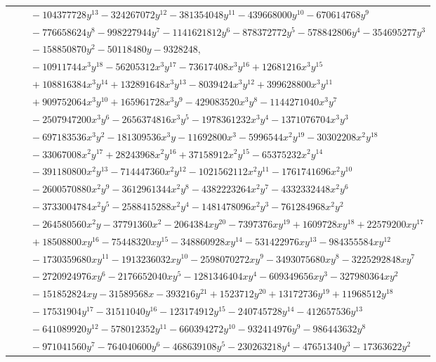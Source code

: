 \documentclass[11pt]{article}
\begin{document}
\begin{longtable}{@{}ll@{}}
 & $\quad -104377728y^{13}-324267072y^{12}-381354048y^{11}-439668000y^{10}-670614768y^{9}$\\
 & $\quad -776658624y^{8}-998227944y^{7}-1141621812y^{6}-878372772y^{5}-578842806y^{4}-354695277y^{3}$\\
 & $\quad -158850870y^{2}-50118480y-9328248,$\\
 & $\quad -10911744x^{3}y^{18}-56205312x^{3}y^{17}-73617408x^{3}y^{16}+12681216x^{3}y^{15}$\\
 & $\quad +108816384x^{3}y^{14}+132891648x^{3}y^{13}-8039424x^{3}y^{12}+399628800x^{3}y^{11}$\\
 & $\quad +909752064x^{3}y^{10}+165961728x^{3}y^{9}-429083520x^{3}y^{8}-1144271040x^{3}y^{7}$\\
 & $\quad -2507947200x^{3}y^{6}-2656374816x^{3}y^{5}-1978361232x^{3}y^{4}-1371076704x^{3}y^{3}$\\
 & $\quad -697183536x^{3}y^{2}-181309536x^{3}y-11692800x^{3}-5996544x^{2}y^{19}-30302208x^{2}y^{18}$\\
 & $\quad -33067008x^{2}y^{17}+28243968x^{2}y^{16}+37158912x^{2}y^{15}-65375232x^{2}y^{14}$\\
 & $\quad -391180800x^{2}y^{13}-714447360x^{2}y^{12}-1021562112x^{2}y^{11}-1761741696x^{2}y^{10}$\\
 & $\quad -2600570880x^{2}y^{9}-3612961344x^{2}y^{8}-4382223264x^{2}y^{7}-4332332448x^{2}y^{6}$\\
 & $\quad -3733004784x^{2}y^{5}-2588415288x^{2}y^{4}-1481478096x^{2}y^{3}-761284968x^{2}y^{2}$\\
 & $\quad -264580560x^{2}y-37791360x^{2}-2064384xy^{20}-7397376xy^{19}+1609728xy^{18}+22579200xy^{17}$\\
 & $\quad +18508800xy^{16}-75448320xy^{15}-348860928xy^{14}-531422976xy^{13}-984355584xy^{12}$\\
 & $\quad -1730359680xy^{11}-1913236032xy^{10}-2598070272xy^{9}-3493075680xy^{8}-3225292848xy^{7}$\\
 & $\quad -2720924976xy^{6}-2176652040xy^{5}-1281346404xy^{4}-609349656xy^{3}-327980364xy^{2}$\\
 & $\quad -151852824xy-31589568x-393216y^{21}+1523712y^{20}+13172736y^{19}+11968512y^{18}$\\
 & $\quad -17531904y^{17}-31511040y^{16}-123174912y^{15}-240745728y^{14}-412657536y^{13}$\\
 & $\quad -641089920y^{12}-578012352y^{11}-660394272y^{10}-932414976y^{9}-986443632y^{8}$\\
 & $\quad -971041560y^{7}-764040600y^{6}-468639108y^{5}-230263218y^{4}-47651340y^{3}-17363622y^{2}$\\

\end{longtable}
\end{document}
